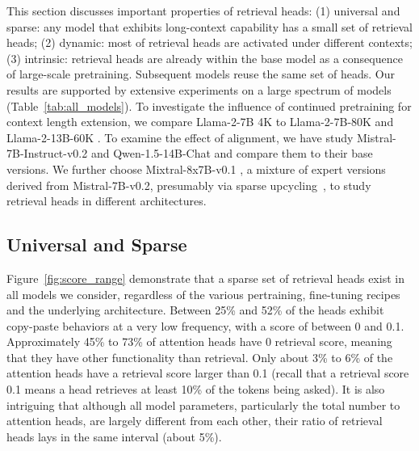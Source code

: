 



This section discusses important properties of retrieval heads:
(1) universal and sparse: any model that exhibits long-context capability has a small set of retrieval heads;
(2) dynamic: most of retrieval heads are activated under different contexts;
(3) intrinsic: retrieval heads are already within the base model as a consequence of large-scale pretraining. Subsequent models reuse the same set of heads. 
Our results are supported by extensive experiments on a large spectrum of models (Table~\ref{tab:all_models}).
To investigate the influence of continued pretraining for context length extension, we compare Llama-2-7B 4K to Llama-2-7B-80K and Llama-2-13B-60K \citep{fu2024data}. 
To examine the effect of alignment, we have study Mistral-7B-Instruct-v0.2 and Qwen-1.5-14B-Chat \citep{bai2023qwen} and compare them to their base versions.
We further choose Mixtral-8x7B-v0.1 \citep{jiang2024mixtral}, a mixture of expert versions derived from Mistral-7B-v0.2, presumably via sparse upcycling~\citep{komatsuzaki2022sparse}, to study retrieval heads in different architectures. 


\subsection{Universal and Sparse}
Figure~\ref{fig:score_range} demonstrate that a sparse set of retrieval heads exist in all models we consider, regardless of the various pertraining, fine-tuning recipes and the underlying architecture.
Between 25\% and 52\% of the heads exhibit copy-paste behaviors at a very low frequency, with a score of between 0 and 0.1. 
Approximately 45\% to 73\% of attention heads have 0 retrieval score, meaning that they have other functionality than retrieval.
Only about 3\% to 6\% of the attention heads have a retrieval score larger than 0.1 (recall that a retrieval score 0.1 means a head retrieves at least 10\% of the tokens being asked).
It is also intriguing that although all model parameters, particularly the total number to attention heads, are largely different from each other, their ratio of retrieval heads lays in the same interval (about 5\%). 




